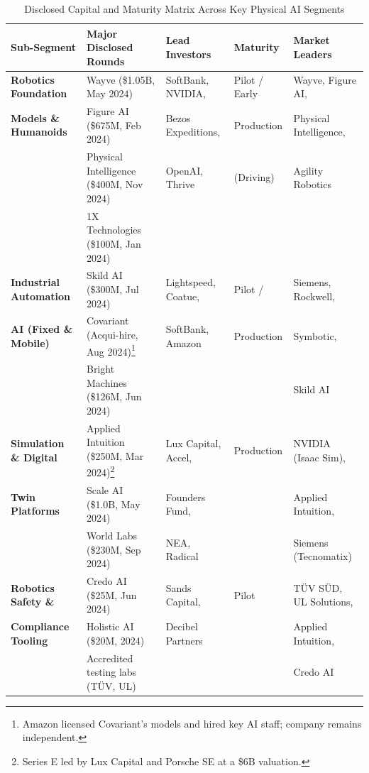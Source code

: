 \documentclass[11pt,a4paper]{article}
\begin{document}
\begin{table}[h!]
\centering
\small
\begin{tabularx}{\textwidth}{@{}l p{4.2cm} p{3.2cm} l X@{}}
\toprule
\textbf{Sub-Segment} & \textbf{Major Disclosed Rounds} & \textbf{Lead Investors} & \textbf{Maturity} & \textbf{Market Leaders} \\
\midrule
\textbf{Robotics Foundation} & Wayve (\$1.05B, May 2024)\newline & SoftBank, NVIDIA, & Pilot / Early & Wayve, Figure AI, \\
\textbf{Models \& Humanoids} & Figure AI (\$675M, Feb 2024)\newline & Bezos Expeditions, & Production & Physical Intelligence, \\
& Physical Intelligence (\$400M, Nov 2024)\newline & OpenAI, Thrive & (Driving) & Agility Robotics \\
& 1X Technologies (\$100M, Jan 2024) & & & \\
\addlinespace
\textbf{Industrial Automation} & Skild AI (\$300M, Jul 2024)\newline & Lightspeed, Coatue, & Pilot / & Siemens, Rockwell, \\
\textbf{AI (Fixed \& Mobile)} & Covariant (Acqui-hire, Aug 2024)\footnote{Amazon licensed Covariant's models and hired key AI staff; company remains independent.}\newline & SoftBank, Amazon & Production & Symbotic, \\
& Bright Machines (\$126M, Jun 2024) & & & Skild AI \\
\addlinespace
\textbf{Simulation \& Digital} & Applied Intuition (\$250M, Mar 2024)\footnote{Series E led by Lux Capital and Porsche SE at a \$6B valuation.}\newline & Lux Capital, Accel, & Production & NVIDIA (Isaac Sim), \\
\textbf{Twin Platforms} & Scale AI (\$1.0B, May 2024)\newline & Founders Fund, & & Applied Intuition, \\
& World Labs (\$230M, Sep 2024) & NEA, Radical & & Siemens (Tecnomatix) \\
\addlinespace
\textbf{Robotics Safety \&} & Credo AI (\$25M, Jun 2024)\newline & Sands Capital, & Pilot & TÜV SÜD, UL Solutions, \\
\textbf{Compliance Tooling} & Holistic AI (\$20M, 2024)\newline & Decibel Partners & & Applied Intuition, \\
& Accredited testing labs (TÜV, UL) & & & Credo AI \\
\bottomrule
\end{tabularx}
\caption{Disclosed Capital and Maturity Matrix Across Key Physical AI Segments}
\end{table}
\end{document}
